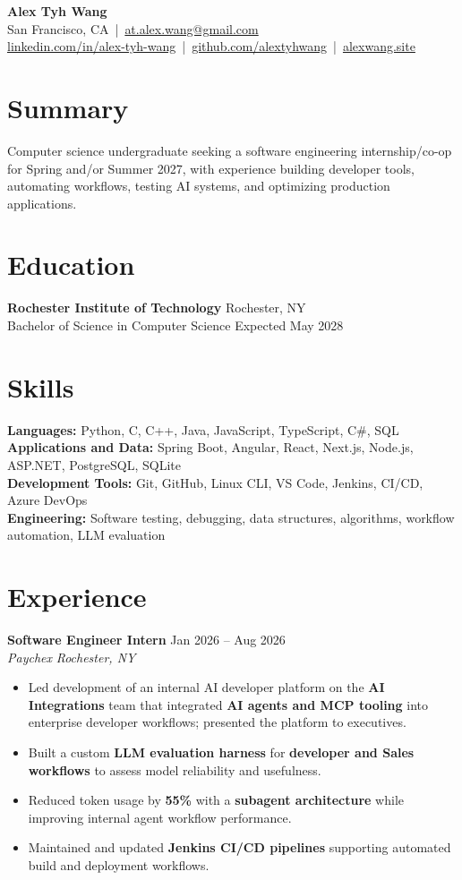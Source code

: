 \documentclass[10pt,letterpaper]{article}
\newif\ifresumeFirstRole
\newcommand{\resumeRole}[4]{%
  \ifresumeFirstRole
    \global\resumeFirstRolefalse
  \else
    \vspace{0pt plus 1fill}%
  \fi
  \textbf{#1} \hfill #2\\
  \textit{#3} \hfill \textit{#4}
}
\begin{document}
\begin{center}
{\Large \textbf{Alex Tyh Wang}}\\
San Francisco, CA \,|\, \href{mailto:at.alex.wang@gmail.com}{at.alex.wang@gmail.com}\\
\small \href{https://www.linkedin.com/in/alex-tyh-wang/}{linkedin.com/in/alex-tyh-wang} \,|\, \href{https://github.com/alextyhwang}{github.com/alextyhwang} \,|\, \href{https://alexwang.site}{alexwang.site}
\end{center}

\section*{Summary}
Computer science undergraduate seeking a software engineering internship/co-op for Spring and/or Summer 2027, with experience building developer tools, automating workflows, testing AI systems, and optimizing production applications.

\section*{Education}
\textbf{Rochester Institute of Technology} \hfill Rochester, NY\\
Bachelor of Science in Computer Science \hfill Expected May 2028

\section*{Skills}
\textbf{Languages:} Python, C, C++, Java, JavaScript, TypeScript, C\#, SQL\\
\textbf{Applications and Data:} Spring Boot, Angular, React, Next.js, Node.js, ASP.NET, PostgreSQL, SQLite\\
\textbf{Development Tools:} Git, GitHub, Linux CLI, VS Code, Jenkins, CI/CD, Azure DevOps\\
\textbf{Engineering:} Software testing, debugging, data structures, algorithms, workflow automation, LLM evaluation

\section*{Experience}
\resumeRole{Software Engineer Intern}{Jan 2026 -- Aug 2026}{Paychex}{Rochester, NY}
\begin{itemize}
  \item Led development of an internal AI developer platform on the \textbf{AI Integrations} team that integrated \textbf{AI agents and MCP tooling} into enterprise developer workflows; presented the platform to executives.
  \item Built a custom \textbf{LLM evaluation harness} for \textbf{developer and Sales workflows} to assess model reliability and usefulness.
  \item Reduced token usage by \textbf{55\%} with a \textbf{subagent architecture} while improving internal agent workflow performance.
  \item Maintained and updated \textbf{Jenkins CI/CD pipelines} supporting automated build and deployment workflows.
\end{itemize}
\end{document}
